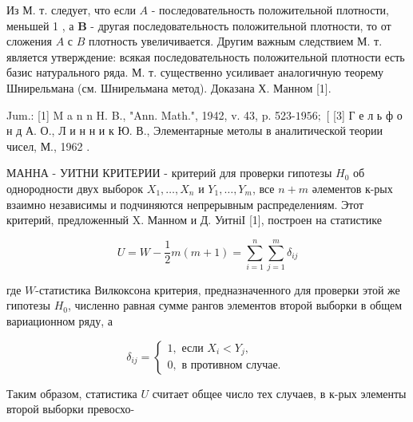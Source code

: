 \documentclass[10pt]{article}
\begin{document}
Из М. т. следует, что если $A$ - последовательность положительной плотности, меньшей 1 , а $\boldsymbol{B}$ - другая последовательность положительной плотности, то от сложения $A$ с $B$ плотность увеличивается. Другим важным следствием М. т. является утверждение: всякая последовательность положительной плотности есть базис натурального ряда. М. т. существенно усиливает аналогичную теорему Шнирельмана (см. Шнирельмана метод). Доказана Х. Манном [1].



Jum.: [1] M a n n H. B., "Ann. Math.", 1942, v. 43, p. 523-$1956 ;$ [ [3] Г е л ь ф о н д А. О., Л и н н и к Ю. В., Элементарные метолы в аналитической теории чисел, М., 1962 .



МАННА - УИТНИ КРИТЕРИИ - критерий для проверки гипотезы $H_{0}$ об однородности двух выборок $X_{1}, \ldots, X_{n}$ и $Y_{1}, \ldots, Y_{m}$, все $n+m$ әлементов к-рых взаимно независимы и подчиняются непрерывным распределениям. Этот критерий, предложенный X. Манном и Д. УитніІ [1], построен на статистике



\[

U=W-\frac{1}{2} m(m+1)=\sum_{i=1}^{n} \sum_{j=1}^{m} \delta_{i j}

\]



где $W$-статистика Вилкоксона критерия, предназначенного для проверки этой же гипотезы $H_{0}$, численно равная сумме рангов элементов второй выборки в общем вариационном ряду, а



\[

\delta_{i j}=\left\{\begin{array}{l}

1, \text { если } X_{i}<Y_{j}, \\

0, \text { в противном случае. }

\end{array}\right.

\]



Таким образом, статистика $U$ считает общее число тех случаев, в к-рых элементы второй выборки превосхо-
\end{document}
